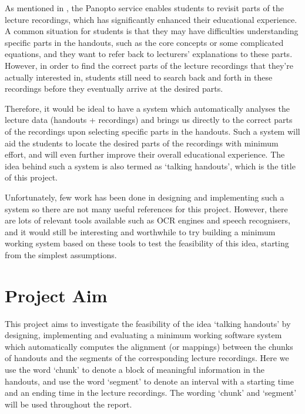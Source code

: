 As mentioned in , the Panopto service enables students to revisit parts of the lecture recordings, which has significantly enhanced their educational experience. A common situation for students is that they may have difficulties understanding specific parts in the handouts, such as the core concepts or some complicated equations, and they want to refer back to lecturers' explanations to these parts. However, in order to find the correct parts of the lecture recordings that they're actually interested in, students still need to search back and forth in these recordings before they eventually arrive at the desired parts.

Therefore, it would be ideal to have a system which automatically analyses the lecture data (handouts + recordings) and brings us directly to the correct parts of the recordings upon selecting specific parts in the handouts. Such a system will aid the students to locate the desired parts of the recordings with minimum effort, and will even further improve their overall educational experience. The idea behind such a system is also termed as `talking handouts', which is the title of this project.

Unfortunately, few work has been done in designing and implementing such a system so there are not many useful references for this project. However, there are lots of relevant tools available such as OCR engines and speech recognisers, and it would still be interesting and worthwhile to try building a minimum working system based on these tools to test the feasibility of this idea, starting from the simplest assumptions.


\section{Project Aim}

This project aims to investigate the feasibility of the idea `talking handouts' by designing, implementing and evaluating a minimum working software system which automatically computes the alignment (or mappings) between the chunks of handouts and the segments of the corresponding lecture recordings. Here we use the word `chunk' to denote a block of meaningful information in the handouts, and use the word `segment' to denote an interval with a starting time and an ending time in the lecture recordings. The wording `chunk' and `segment' will be used throughout the report.

